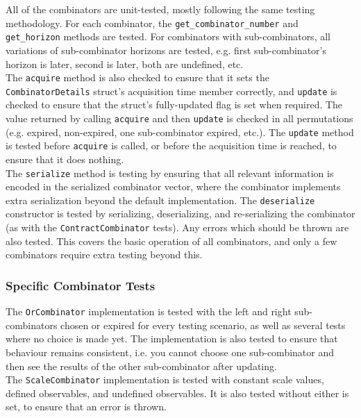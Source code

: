 All of the combinators are unit-tested, mostly following the same testing methodology. For each combinator, the \texttt{get\_combinator\_number} and \texttt{get\_horizon} methods are tested. For combinators with sub-combinators, all variations of sub-combinator horizons are tested, e.g. first sub-combinator's horizon is later, second is later, both are undefined, etc. \\

The \texttt{acquire} method is also checked to ensure that it sets the \texttt{CombinatorDetails} struct's acquisition time member correctly, and \texttt{update} is checked to ensure that the struct's fully-updated flag is set when required. The value returned by calling \texttt{acquire} and then \texttt{update} is checked in all permutations (e.g. expired, non-expired, one sub-combinator expired, etc.). The \texttt{update} method is tested before \texttt{acquire} is called, or before the acquisition time is reached, to ensure that it does nothing. \\

The \texttt{serialize} method is testing by ensuring that all relevant information is encoded in the serialized combinator vector, where the combinator implements extra serialization beyond the default implementation. The \texttt{deserialize} constructor is tested by serializing, deserializing, and re-serializing the combinator (as with the \texttt{ContractCombinator} tests). Any errors which should be thrown are also tested. This covers the basic operation of all combinators, and only a few combinators require extra testing beyond this.


\subsubsection{Specific Combinator Tests}

The \texttt{OrCombinator} implementation is tested with the left and right sub-combinators chosen or expired for every testing scenario, as well as several tests where no choice is made yet. The implementation is also tested to ensure that behaviour remains consistent, i.e. you cannot choose one sub-combinator and then see the results of the other sub-combinator after updating. \\

The \texttt{ScaleCombinator} implementation is tested with constant scale values, defined observables, and undefined observables. It is also tested without either is set, to ensure that an error is thrown. \\


